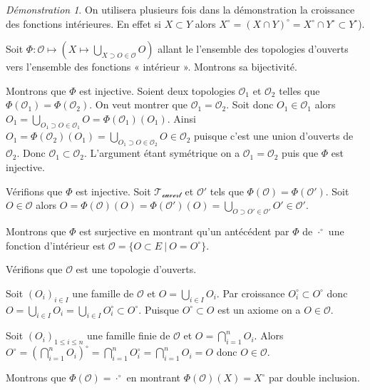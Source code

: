 \documentclass[a4paper, 11pt, french]{book}
\newenvironment{itemise}{\itemize}{\enditemize}
\theoremstyle{plain} %
\theoremstyle{definition} %
\theoremstyle{remark} %
\newtheorem*{demonstration}{Démonstration}
\newcommand{\1}{\mathds{1}}
\newcommand{\infegal}{\leqslant}
\newcommand\ens[2]{\{#1 \ |\ #2\}}
\begin{document}
\begin{demonstration}
	On utilisera plusieurs fois dans la démonstration la croissance des fonctions intérieures.
	En effet si $X\subset Y$ alors $X^\circ=(X\cap Y)^\circ=X^\circ\cap Y^\circ\subset Y^\circ$).

	Soit $\Phi\colon\mathscr{O}\mapsto(X\mapsto\bigcup_{X\supset O\in\mathscr{O}}O)$ allant le l'ensemble des topologies d'ouverts vers l'ensemble des fonctions « intérieur ».
	Montrons sa bijectivité.
	\begin{itemise}
		\item Montrons que $\Phi$ est injective.
		Soient deux topologies $\mathscr{O}_1$ et $\mathscr{O}_2$ telles que $\Phi(\mathscr{O}_1)=\Phi(\mathscr{O}_2)$.
		On veut montrer que $\mathscr{O}_1=\mathscr{O}_2$.
		Soit donc $O_1\in\mathscr{O}_1$ alors $O_1=\bigcup_{O_1\supset O\in\mathscr{O}_1}O=\Phi(\mathscr{O}_1)(O_1)$.
		Ainsi $O_1=\Phi(\mathscr{O}_2)(O_1)=\bigcup_{O_1\supset O\in\mathscr{O}_2}O\in\mathscr{O}_2$ puisque c'est une union d'ouverts de $\mathscr{O}_2$.
		Donc $\mathscr{O}_1\subset\mathscr{O}_2$.
		L'argument étant symétrique on a $\mathscr{O}_1=\mathscr{O}_2$ puis que $\Phi$ est injective.
		\item Vérifions que $\Phi$ est injective.
		Soit $\mathscr{T_\text{ouvert}}$ et $\mathscr{O}'$ tels que $\Phi(\mathscr{O})=\Phi(\mathscr{O}')$.
		Soit $O\in\mathscr{O}$ alors $O=\Phi(\mathscr{O})(O)=\Phi(\mathscr{O}')(O)=\bigcup_{O\supset O'\in\mathscr{O}'}O'\in\mathscr{O}'$.
		\item Montrons que $\Phi$ est surjective en montrant qu'un antécédent par $\Phi$ de $\cdot^\circ$ une fonction d'intérieur est $\mathscr{O}=\ens{O\subset E}{O=O^\circ}$.
		\begin{itemise}
			\item Vérifions que $\mathscr{O}$ est une topologie d'ouverts.
			\begin{itemise}
				\item Soit $(O_i)_{i\in I}$ une famille de $\mathscr{O}$ et $O=\bigcup_{i\in I}O_i$.
				Par croissance $O_i^\circ\subset O^\circ$ donc $O=\bigcup_{i\in I}O_i=\bigcup_{i\in I}O_i^\circ\subset O^\circ$.
				Puisque $O^\circ\subset O$ est un axiome on a $O\in\mathscr{O}$.
				\item Soit $(O_i)_{1\infegal i\infegal n}$ une famille finie de $\mathscr{O}$ et $O=\bigcap_{i=1}^nO_i$.
				Alors $O^\circ=(\bigcap_{i=1}^nO_i)^\circ=\bigcap_{i=1}^nO_i^\circ=\bigcap_{i=1}^nO_i=O$ donc $O\in\mathscr{O}$.
			\end{itemise}
			\item Montrons que $\Phi(\mathscr{O})=\cdot^\circ$ en montrant $\Phi(\mathscr{O})(X)=X^\circ$ par double inclusion.

\end{itemise}
\end{itemise}
\end{demonstration}
\end{document}
